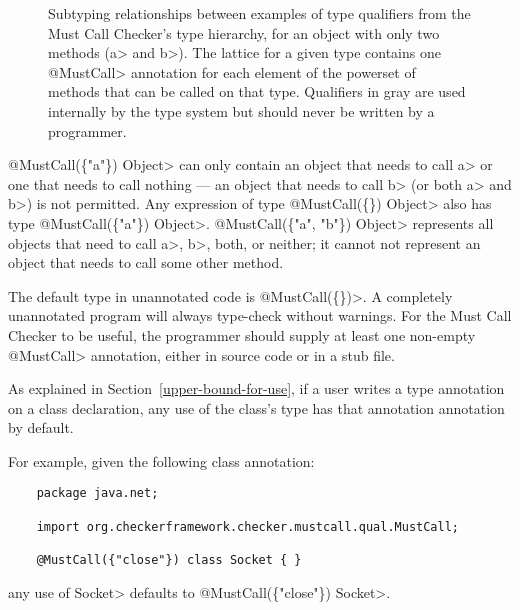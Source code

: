 \begin{figure}
\caption{Subtyping relationships between examples of type qualifiers from the Must Call Checker's type
hierarchy, for an object with only two methods (\<a> and \<b>).
The lattice for a given type contains one \<@MustCall> annotation for each element of the powerset
of methods that can be called on that type.
Qualifiers in gray are used internally by the type system but should
never be written by a programmer.}
\label{fig-must-call-hierarchy}
\end{figure}

\<@MustCall(\{"a"\}) Object> can only
contain an object that needs to call \<a> or one that needs to call nothing --- an
object that needs to call \<b> (or both \<a> and \<b>) is not permitted.
Any expression of type \<@MustCall(\{\}) Object> also has type
\<@MustCall(\{"a"\}) Object>.
\<@MustCall(\{"a", "b"\}) Object> represents all objects that need to
call \<a>, \<b>, both, or neither; it cannot not represent an object that needs
to call some other method.

The default type in unannotated code is \<@MustCall(\{\})>.
A completely unannotated program will always type-check without warnings.
For the Must Call Checker to be useful, the programmer should supply at least one non-empty
\<@MustCall> annotation, either in source code or in a stub file.


As explained in Section~\ref{upper-bound-for-use}, if a user writes a type
annotation on a class declaration, any use of the class's type has that
annotation annotation by default.

For example, given the following class annotation:
\begin{Verbatim}
    package java.net;

    import org.checkerframework.checker.mustcall.qual.MustCall;

    @MustCall({"close"}) class Socket { }
\end{Verbatim}
any use of \<Socket> defaults to \<@MustCall(\{"close"\}) Socket>.



